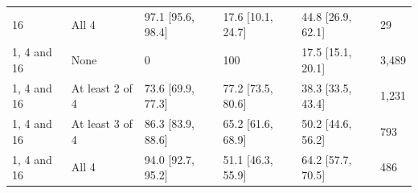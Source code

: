 \begin{tabular}{@{}llllll@{}}
16 & All 4 & 97.1 {\scriptsize[95.6, 98.4]} & 17.6 {\scriptsize[10.1, 24.7]} & 44.8 {\scriptsize[26.9, 62.1]} & 29 \\
1, 4 and 16 & None & 0 & 100 & 17.5 {\scriptsize[15.1, 20.1]} & 3{,}489 \\
1, 4 and 16 & At least 2 of 4 & 73.6 {\scriptsize[69.9, 77.3]} & 77.2 {\scriptsize[73.5, 80.6]} & 38.3 {\scriptsize[33.5, 43.4]} & 1{,}231 \\
1, 4 and 16 & At least 3 of 4 & 86.3 {\scriptsize[83.9, 88.6]} & 65.2 {\scriptsize[61.6, 68.9]} & 50.2 {\scriptsize[44.6, 56.2]} & 793 \\
1, 4 and 16 & All 4 & 94.0 {\scriptsize[92.7, 95.2]} & 51.1 {\scriptsize[46.3, 55.9]} & 64.2 {\scriptsize[57.7, 70.5]} & 486 \\
\bottomrule
\end{tabular}
